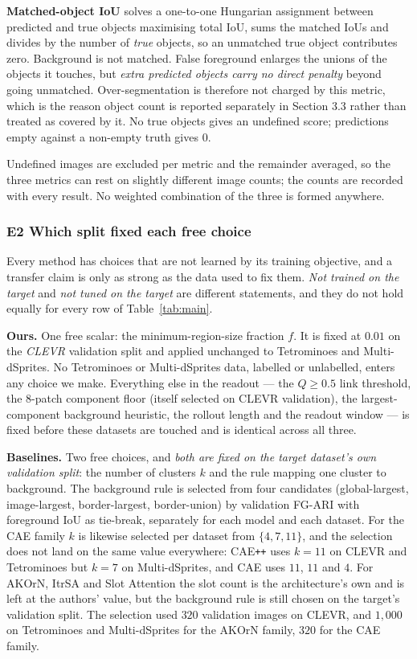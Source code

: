 \textbf{Matched-object IoU} solves a one-to-one Hungarian assignment between predicted and true
objects maximising total IoU, sums the matched IoUs and divides by the number of \emph{true}
objects, so an unmatched true object contributes zero. Background is not matched. False
foreground enlarges the unions of the objects it touches, but \emph{extra predicted objects carry
no direct penalty} beyond going unmatched. Over-segmentation is therefore not charged by this
metric, which is the reason object count is reported separately in Section 3.3 rather than
treated as covered by it. No true objects gives an undefined score; predictions empty against a
non-empty truth gives $0$.

Undefined images are excluded per metric and the remainder averaged, so the three metrics can
rest on slightly different image counts; the counts are recorded with every result. No weighted
combination of the three is formed anywhere.

\subsubsection{E2 Which split fixed each free choice}
Every method has choices that are not learned by its training objective, and a transfer claim is
only as strong as the data used to fix them. \emph{Not trained on the target} and \emph{not tuned
on the target} are different statements, and they do not hold equally for every row of
Table~\ref{tab:main}.

\textbf{Ours.} One free scalar: the minimum-region-size fraction $f$. It is fixed at $0.01$ on the
\emph{CLEVR} validation split and applied unchanged to Tetrominoes and Multi-dSprites. No
Tetrominoes or Multi-dSprites data, labelled or unlabelled, enters any choice we make. Everything
else in the readout --- the $Q\ge0.5$ link threshold, the 8-patch component floor (itself
selected on CLEVR validation), the largest-component background heuristic, the rollout length
and the readout window --- is fixed before these datasets are touched and is identical across
all three.

\textbf{Baselines.} Two free choices, and \emph{both are fixed on the target dataset's own
validation split}: the number of clusters $k$ and the rule mapping one cluster to background.
The background rule is selected from four candidates (global-largest, image-largest,
border-largest, border-union) by validation FG-ARI with foreground IoU as tie-break, separately
for each model and each dataset. For the CAE family $k$ is likewise selected per dataset from
$\{4,7,11\}$, and the selection does not land on the same value everywhere: CAE\texttt{++} uses
$k=11$ on CLEVR and Tetrominoes but $k=7$ on Multi-dSprites, and CAE uses $11$, $11$ and $4$. For
AKOrN, ItrSA and Slot Attention the slot count is the architecture's own and is left at the
authors' value, but the background rule is still chosen on the target's validation split. The
selection used $320$ validation images on CLEVR, and $1{,}000$ on Tetrominoes and Multi-dSprites
for the AKOrN family, $320$ for the CAE family.

